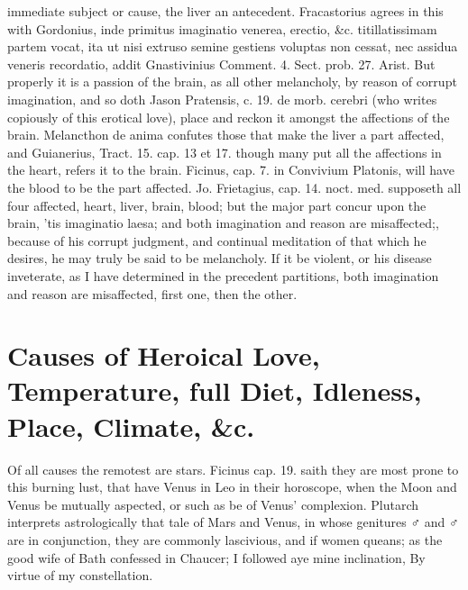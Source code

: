 {immediate subject or cause, the liver an antecedent. Fracastorius
agrees in this with Gordonius, inde primitus imaginatio venerea,
erectio, \&c. titillatissimam partem vocat, ita ut nisi extruso semine
gestiens voluptas non cessat, nec assidua veneris recordatio, addit
Gnastivinius Comment. 4. Sect. prob. 27. Arist. But properly it
is a passion of the brain, as all other melancholy, by reason of
corrupt imagination, and so doth Jason Pratensis, c. 19. de morb.
cerebri (who writes copiously of this erotical love), place and reckon
it amongst the affections of the brain. Melancthon de anima
confutes those that make the liver a part affected, and Guianerius,
Tract. 15. cap. 13 et 17. though many put all the affections in the
heart, refers it to the brain. Ficinus, cap. 7. in Convivium Platonis,
will have the blood to be the part affected. Jo. Frietagius, cap. 14.
noct. med. supposeth all four affected, heart, liver, brain, blood; but
the major part concur upon the brain, 'tis imaginatio laesa; and
both imagination and reason are misaffected;, because of his corrupt
judgment, and continual meditation of that which he desires, he may
truly be said to be melancholy. If it be violent, or his disease
inveterate, as I have determined in the precedent partitions, both
imagination and reason are misaffected, first one, then the other.


\section[Causes of Heroical Love]{Causes of Heroical Love, Temperature, full Diet, Idleness, Place, Climate, \&c.}

Of all causes the remotest are stars. Ficinus cap. 19. saith they
are most prone to this burning lust, that have Venus in Leo in their
horoscope, when the Moon and Venus be mutually aspected, or such as be
of Venus' complexion. Plutarch interprets astrologically that
tale of Mars and Venus, in whose genitures ♂ and ♂ are in conjunction,
they are commonly lascivious, and if women queans; as the good wife of
Bath confessed in Chaucer;
I followed aye mine inclination,
By virtue of my constellation.

}
